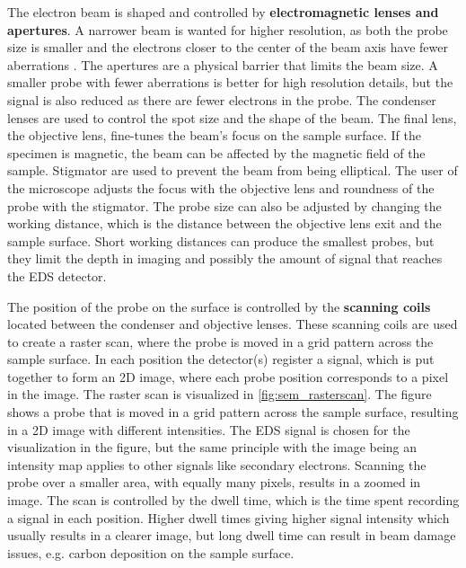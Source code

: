 The electron beam is shaped and controlled by \textbf{electromagnetic lenses and apertures}.
A narrower beam is wanted for higher resolution, as both the probe size is smaller and the electrons closer to the center of the beam axis have fewer aberrations \cite{goodhew_2001}.
The apertures are a physical barrier that limits the beam size.
A smaller probe with fewer aberrations is better for high resolution details, but the signal is also reduced as there are fewer electrons in the probe.
The condenser lenses are used to control the spot size and the shape of the beam.
The final lens, the objective lens, fine-tunes the beam's focus on the sample surface.
If the specimen is magnetic, the beam can be affected by the magnetic field of the sample.
Stigmator are used to prevent the beam from being elliptical.
The user of the microscope adjusts the focus with the objective lens and roundness of the probe with the stigmator.
The probe size can also be adjusted by changing the working distance, which is the distance between the objective lens exit and the sample surface.
Short working distances can produce the smallest probes, but they limit the depth in imaging and possibly the amount of signal that reaches the EDS detector.


The position of the probe on the surface is controlled by the \textbf{scanning coils} located between the condenser and objective lenses.
These scanning coils are used to create a raster scan, where the probe is moved in a grid pattern across the sample surface.
In each position the detector(s) register a signal, which is put together to form an 2D image, where each probe position corresponds to a pixel in the image.
The raster scan is visualized in \cref{fig:sem_rasterscan}.
The figure shows a probe that is moved in a grid pattern across the sample surface, resulting in a 2D image with different intensities.
The EDS signal is chosen for the visualization in the figure, but the same principle with the image being an intensity map applies to other signals like secondary electrons.
Scanning the probe over a smaller area, with equally many pixels, results in a zoomed in image.
The scan is controlled by the dwell time, which is the time spent recording a signal in each position.
Higher dwell times giving higher signal intensity which usually results in a clearer image, but long dwell time can result in beam damage issues, e.g. carbon deposition on the sample surface.

